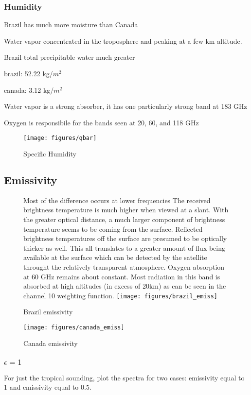 \documentclass[twocol]{ametsoc}
\begin{document}
\subsubsection{Humidity}

Brazil has much more moisture than Canada

Water vapor concentrated in the troposphere and peaking at a few km altitude.

Brazil total precipitable water much greater

brazil: 52.22 kg/$m^2$

canada: 3.12 kg/$m^2$

Water vapor is a strong absorber, it has one particularly strong band at 183 GHz

Oxygen is responsibile for the bands seen at 20, 60, and 118 GHz

\begin{figure}
	\centering
	\texttt{[image: figures/qbar]}
	\caption{Specific Humidity}
	\label{fig:qbar}
\end{figure}

\subsection{Emissivity}


\begin{figure}Most of the difference occurs at lower frequencies
The received brightness temperature is much higher when viewed at a slant. With the greater optical distance, a much larger component of brightness temperature seems to be coming from the surface. Reflected brightness temperatures off the surface are presumed to be optically thicker as well. This all translates to a greater amount of flux being available at the surface which can be detected by the satellite throught the relatively transparent atmosphere.
Oxygen absorption at 60 GHz remains about constant. Most radiation in this band is absorbed at high altitudes (in excess of 20km) as can be seen in the channel 10 weighting function.
	\centering
	\texttt{[image: figures/brazil\_emiss]}
	\caption{Brazil emissivity}
	\label{fig:bemiss}
\end{figure}


\begin{figure}
	\centering
	\texttt{[image: figures/canada\_emiss]}
	\caption{Canada emissivity}
	\label{fig:cemiss}
\end{figure}

\subsubsection{$\epsilon = 1$}
For just the tropical sounding, plot the spectra for two cases:  emissivity equal to 1  and emissivity equal to 0.5.
\end{document}
